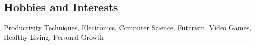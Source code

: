 \documentclass[margin, 10pt]{res} %
\begin{document}
\begin{resume}

\section{Hobbies and Interests}

Productivity  Techniques, Electronics, Computer Science, Futurism, Video Games, Healthy  Living,  Personal  Growth


\end{resume}
\end{document}
